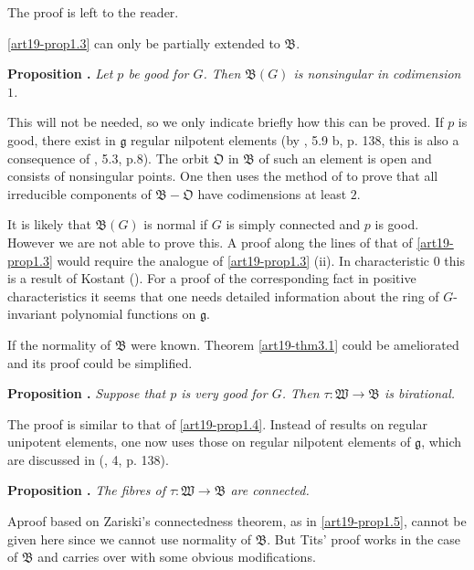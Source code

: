 The proof is left to the reader.

\ref{art19-prop1.3} can only be partially extended to $\mathfrak{B}$.

\medskip
\noindent
{\bf Proposition .\label{art19-prop2.3}}
{\em Let $p$ be good for $G$. Then $\mathfrak{B}(G)$ is nonsingular in codimension $1$.}
\smallskip

This will not be needed, so we only indicate briefly how this can be proved. If $p$ is good, there exist in $\mathfrak{g}$ regular nilpotent elements (by \cite{art19-key14}, 5.9 b, p. 138, this is also a consequence of \cite{art19-key10}, 5.3, p.8). The orbit $\mathfrak{O}$ in $\mathfrak{B}$ of such an element is open and consists of nonsingular points. One then uses the method of \cite{art19-key15} to prove that all irreducible components of $\mathfrak{B}-\mathfrak{O}$ have codimensions at least $2$.

It is likely that $\mathfrak{B}(G)$ is normal if $G$ is simply connected and $p$ is good. However we are not able to prove this. A proof along the lines of that of \ref{art19-prop1.3} would require the analogue of \ref{art19-prop1.3} (ii). In characteristic $0$ this is a result of Kostant (\cite{art19-key9}). For a proof of the corresponding fact in positive characteristics it seems that one needs detailed information about the ring of $G$-invariant polynomial functions on $\mathfrak{g}$.

If the normality of $\mathfrak{B}$ were known. Theorem \ref{art19-thm3.1} could be ameliorated and its proof could be simplified.

\medskip
\noindent
{\bf Proposition .\label{art19-prop2.4}}
{\em Suppose that $p$ is very good for $G$. Then $\tau :\mathfrak{W}\to \mathfrak{B}$ is birational.}
\smallskip

The proof is similar to that of \ref{art19-prop1.4}. Instead of results on regular unipotent elements, one now uses those on regular nilpotent elements of $\mathfrak{g}$, which are discussed in (\cite{art19-key14}, 4, p. 138).

\eject

\noindent
{\bf Proposition .\label{art19-prop2.5}}
{\em The fibres of $\tau : \mathfrak{W}\to \mathfrak{B}$ are connected.}
\smallskip

A\pageoriginale proof based on Zariski's connectedness theorem, as in \ref{art19-prop1.5}, cannot be given here since we cannot use normality of $\mathfrak{B}$. But Tits' proof works in the case of $\mathfrak{B}$ and carries over with some obvious modifications.

